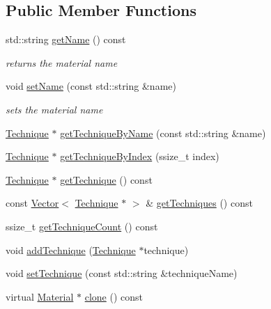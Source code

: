 \subsection*{Public Member Functions}
\begin{DoxyCompactItemize}
\item 
\mbox{\label{classMaterial_a764714e37bbe1499d750b58b4056460b}} 
std\+::string \hyperlink{classMaterial_a764714e37bbe1499d750b58b4056460b}{get\+Name} () const
\begin{DoxyCompactList}\small\item\em returns the material name \end{DoxyCompactList}\item 
\mbox{\label{classMaterial_aeb35f4d95c6de13f6181cd75b7a693cf}} 
void \hyperlink{classMaterial_aeb35f4d95c6de13f6181cd75b7a693cf}{set\+Name} (const std\+::string \&name)
\begin{DoxyCompactList}\small\item\em sets the material name \end{DoxyCompactList}\item 
\hyperlink{classTechnique}{Technique} $\ast$ \hyperlink{classMaterial_a45e112d67c0e8a6590cb42b26f4bf7c9}{get\+Technique\+By\+Name} (const std\+::string \&name)
\item 
\hyperlink{classTechnique}{Technique} $\ast$ \hyperlink{classMaterial_a8561c6726a6be698bc61153e71cfcedc}{get\+Technique\+By\+Index} (ssize\+\_\+t index)
\item 
\hyperlink{classTechnique}{Technique} $\ast$ \hyperlink{classMaterial_af836a89c249c129938b2572bde8780c3}{get\+Technique} () const
\item 
const \hyperlink{classVector}{Vector}$<$ \hyperlink{classTechnique}{Technique} $\ast$ $>$ \& \hyperlink{classMaterial_aa185c54c143d5a53a793c6653dc8b606}{get\+Techniques} () const
\item 
ssize\+\_\+t \hyperlink{classMaterial_aff04e4a8db76db38e7dcc526f0d88608}{get\+Technique\+Count} () const
\item 
void \hyperlink{classMaterial_a88f5ba975802241aa0ce984257b8a56a}{add\+Technique} (\hyperlink{classTechnique}{Technique} $\ast$technique)
\item 
void \hyperlink{classMaterial_a8f575095237a64a95d08a2a3062acc4f}{set\+Technique} (const std\+::string \&technique\+Name)
\item 
virtual \hyperlink{classMaterial}{Material} $\ast$ \hyperlink{classMaterial_a9e04c5c84a42e10e267157125106104f}{clone} () const

\end{DoxyCompactItemize}

